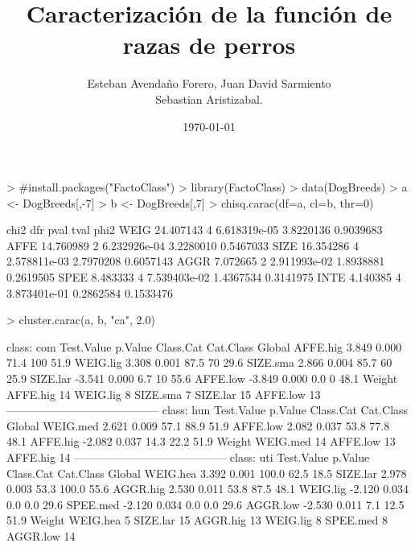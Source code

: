 \documentclass[letterpaper, 12pt]{article}
\title{Caracterización de la función de razas de perros}
\author{Esteban Avendaño Forero, Juan David Sarmiento\\
Sebastian Aristizabal.}
\date{\today}
\begin{document}


\maketitle

\begin{Schunk}
\begin{Sinput}
> #install.packages("FactoClass")
> library(FactoClass)
> data(DogBreeds)
> a <- DogBreeds[,-7]
> b <- DogBreeds[,7]
> chisq.carac(df=a, cl=b, thr=0)
\end{Sinput}
\begin{Soutput}
          chi2 dfr         pval      tval      phi2
WEIG 24.407143   4 6.618319e-05 3.8220136 0.9039683
AFFE 14.760989   2 6.232926e-04 3.2280010 0.5467033
SIZE 16.354286   4 2.578811e-03 2.7970208 0.6057143
AGGR  7.072665   2 2.911993e-02 1.8938881 0.2619505
SPEE  8.483333   4 7.539403e-02 1.4367534 0.3141975
INTE  4.140385   4 3.873401e-01 0.2862584 0.1533476
\end{Soutput}
\end{Schunk}
\newpage 
\begin{Schunk}
\begin{Sinput}
> cluster.carac(a, b, "ca", 2.0)
\end{Sinput}
\begin{Soutput}
class: com
         Test.Value p.Value Class.Cat Cat.Class Global
AFFE.hig      3.849   0.000      71.4       100   51.9
WEIG.lig      3.308   0.001      87.5        70   29.6
SIZE.sma      2.866   0.004      85.7        60   25.9
SIZE.lar     -3.541   0.000       6.7        10   55.6
AFFE.low     -3.849   0.000       0.0         0   48.1
         Weight
AFFE.hig     14
WEIG.lig      8
SIZE.sma      7
SIZE.lar     15
AFFE.low     13
----------------------------------------- 
class: hun
         Test.Value p.Value Class.Cat Cat.Class Global
WEIG.med      2.621   0.009      57.1      88.9   51.9
AFFE.low      2.082   0.037      53.8      77.8   48.1
AFFE.hig     -2.082   0.037      14.3      22.2   51.9
         Weight
WEIG.med     14
AFFE.low     13
AFFE.hig     14
----------------------------------------- 
class: uti
         Test.Value p.Value Class.Cat Cat.Class Global
WEIG.hea      3.392   0.001     100.0      62.5   18.5
SIZE.lar      2.978   0.003      53.3     100.0   55.6
AGGR.hig      2.530   0.011      53.8      87.5   48.1
WEIG.lig     -2.120   0.034       0.0       0.0   29.6
SPEE.med     -2.120   0.034       0.0       0.0   29.6
AGGR.low     -2.530   0.011       7.1      12.5   51.9
         Weight
WEIG.hea      5
SIZE.lar     15
AGGR.hig     13
WEIG.lig      8
SPEE.med      8
AGGR.low     14
\end{Soutput}
\end{Schunk}
\end{document}
